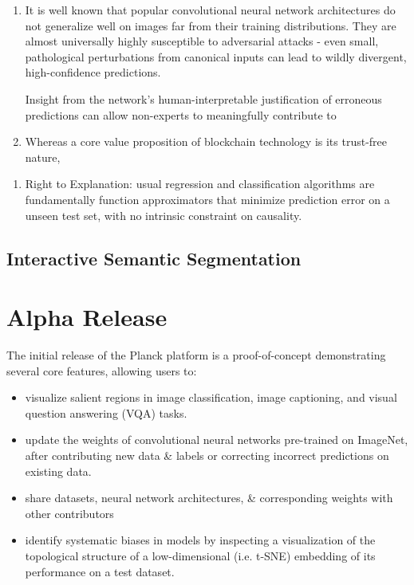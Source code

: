 \documentclass[12pt]{article}
\begin{document}
\begin{enumerate}
\item{It is well known that popular convolutional neural network architectures do not generalize well on images far from their training distributions.  They are almost universally highly susceptible to adversarial attacks - even small, pathological perturbations from canonical inputs can lead to wildly divergent, high-confidence predictions.  

Insight from the network's human-interpretable justification of erroneous predictions can allow non-experts to meaningfully contribute to }
\item{Whereas a core value proposition of blockchain technology is its trust-free nature, }
\end{enumerate}

\begin{enumerate}
\item{Right to Explanation: usual regression and classification algorithms are fundamentally function approximators that minimize prediction error on a unseen test set, with no intrinsic constraint on causality.  }
\end{enumerate}

\subsection{Interactive Semantic Segmentation}

\section{Alpha Release}
The initial release of the Planck platform is a proof-of-concept demonstrating several core features, allowing users to:
\begin{itemize}
\item{visualize salient regions in image classification, image captioning, and visual question answering (VQA) tasks.}
\item{update the weights of convolutional neural networks pre-trained on ImageNet, after contributing new data \& labels or correcting incorrect predictions on existing data.}
\item{share datasets, neural network architectures, \& corresponding weights with other contributors}
\item{identify systematic biases in models by inspecting a visualization of the topological structure of a low-dimensional (i.e. t-SNE) embedding of its performance on a test dataset.}
\end{itemize}
\end{document}
